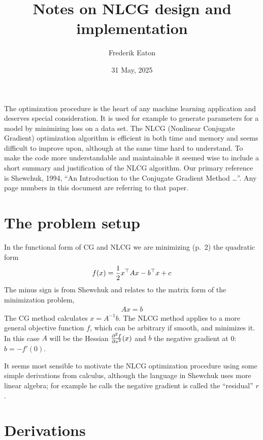 \documentclass[11pt]{article}
\author{Frederik Eaton}
\date{31 May, 2025}
\title{Notes on NLCG design and implementation}
\newcommand{\T}{\top}
\renewcommand{\(}{\left(}
\renewcommand{\)}{\right)}
\newcommand{\partbyt}[2]{{\partial^2 #1\over {\partial #2}^2}}
\begin{document}
\maketitle

The optimization procedure is the heart of any machine learning
application and deserves special consideration. It is used for example
to generate parameters for a model by minimizing loss on a data set.
The NLCG (Nonlinear Conjugate Gradient) optimization algorithm is
efficient in both time and memory and seems difficult to improve upon,
although at the same time hard to understand. To make the code more
understandable and maintainable it seemed wise to include a short
summary and justification of the NLCG algorithm. Our primary reference
is Shewchuk, 1994, ``An Introduction to the Conjugate Gradient Method
\ldots''. Any page numbers in this document are referring to that
paper.

\tableofcontents

\section{The problem setup}

In the functional form of CG and NLCG we are minimizing (p.~2) the
quadratic form
\begin{align}
f(x) = {1\over 2} x^\T A x - b^\T x + c
\end{align}
The minus sign is from Shewchuk and relates to the matrix form of the
minimization problem,
\begin{align}
Ax=b
\end{align}
The CG method calculates $x=A^{-1} b$. The NLCG method applies to a
more general objective function $f$, which can be arbitrary if smooth,
and minimizes it. In this case $A$ will be the Hessian
$\partbyt{f}{x}(x)$ and $b$ the negative gradient at 0: $b=-f'(0)$.

It seems most sensible to motivate the NLCG optimization procedure
using some simple derivations from calculus, although the language in
Shewchuk uses more linear algebra; for example he calls the negative
gradient is called the ``residual'' $r$.

\section{Derivations}

\newcommand{\deriv}[1]{
  \refstepcounter{deriv}
    \vspace{1em}
    \noindent\textbf{Derivation \thederiv: #1} \\
}
\end{document}
